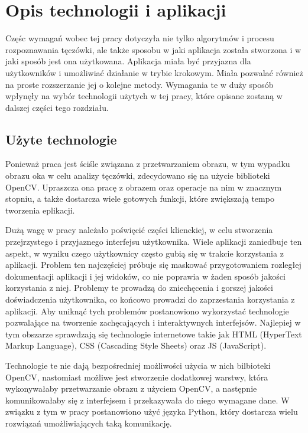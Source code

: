 \chapter{Opis technologii i aplikacji}

Częśc wymagań wobec tej pracy dotyczyła nie tylko algorytmów i procesu rozpoznawania
tęczówki, ale także sposobu w jaki aplikacja została stworzona i w jaki sposób jest
ona użytkowana. Aplikacja miała by\'c przyjazna dla użytkowników i umożliwia\'c działanie
w trybie krokowym. Miała pozwala\'c również na proste rozszerzanie jej o kolejne
metody. Wymagania te w duży sposób wpłynęły na wybór technologii użytych w tej pracy,
które opisane zostaną w dalszej części tego rozdziału.

\section{Użyte technologie}

Ponieważ praca jest ściśle związana z przetwarzaniem obrazu, w tym wypadku obrazu oka
w celu analizy tęczówki, zdecydowano się na użycie biblioteki OpenCV. Upraszcza ona pracę
z obrazem oraz operacje na nim w znacznym stopniu, a także dostarcza wiele gotowych
funkcji, które zwiększają tempo tworzenia eplikacji.\newline

Dużą wagę w pracy należało poświęci\'c części klienckiej, w celu stworzenia przejrzystego i
przyjaznego interfejsu użytkownika. Wiele aplikacji zaniedbuje ten aspekt, w wyniku czego
użytkownicy często gubią się w trakcie korzystania z aplikacji. Problem ten najczęściej próbuje
się maskowa\'c przygotowaniem rozległej dokumentacji aplikacji i jej widoków, co nie poprawia
w żaden sposób jakości korzystania z niej. Problemy te prowadzą do zniechęcenia i gorszej jakości
doświadczenia użytkownika, co końcowo prowadzi do zaprzestania korzystania z aplikacji. Aby
unikną\'c tych problemów postanowiono wykorzysta\'c technologie pozwalające na tworzenie
zachęcających i interaktywnych interfejsów. Najlepiej w tym obszarze sprawdzają się technologie
internetowe takie jak HTML (HyperText Markup Language), CSS (Cascading Style Sheets) oraz JS
(JavaScript).

Technologie te nie dają bezpośredniej możliwości użycia w nich bilbioteki OpenCV, nastomiast
możliwe jest stworzenie dodatkowej warstwy, która wykonywałaby przetwarzanie obrazu z
użyciem OpenCV, a następnie komunikowałaby się z interfejsem i przekazywała do niego
wymagane dane. W związku z tym w pracy postanowiono uży\'c języka Python, który dostarcza wielu
rozwiązań umożliwiających taką komunikację.\newline

